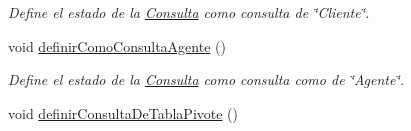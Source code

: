 \begin{DoxyCompactItemize}
\begin{DoxyCompactList}\small\item\em \-Define el estado de la \hyperlink{classConsulta}{\-Consulta} como consulta de \char`\"{}\-Cliente\char`\"{}. \end{DoxyCompactList}\item 
\hypertarget{classConsulta_a592341b178ed0ab458a4c873dd5492ff}{void \hyperlink{classConsulta_a592341b178ed0ab458a4c873dd5492ff}{definir\-Como\-Consulta\-Agente} ()}\label{classConsulta_a592341b178ed0ab458a4c873dd5492ff}

\begin{DoxyCompactList}\small\item\em \-Define el estado de la \hyperlink{classConsulta}{\-Consulta} como consulta como de \char`\"{}\-Agente\char`\"{}. \end{DoxyCompactList}\item 
\hypertarget{classConsulta_a165215249beb1a7d6da248e234d7d682}{void \hyperlink{classConsulta_a165215249beb1a7d6da248e234d7d682}{definir\-Consulta\-De\-Tabla\-Pivote} ()}\label{classConsulta_a165215249beb1a7d6da248e234d7d682}


\end{DoxyCompactItemize}
